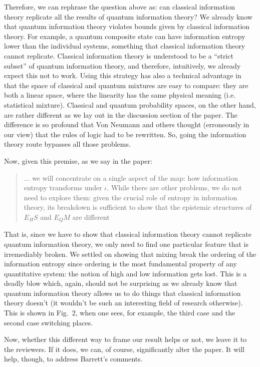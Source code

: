 \documentclass[11pt]{article}
\begin{document}
	Therefore, we can rephrase the question above as: can classical information theory replicate all the results of quantum information theory? We already know that quantum information theory violates bounds given by classical information theory. For example, a quantum composite state can have information entropy lower than the individual systems, something that classical information theory cannot replicate. Classical information theory is understood to be a ``strict subset'' of quantum information theory, and therefore, intuitively, we already expect this not to work. Using this strategy has also a technical advantage in that the space of classical and quantum mixtures are easy to compare: they are both a linear space, where the linearity has the same physical meaning (i.e. statistical mixture). Classical and quantum probability spaces, on the other hand, are rather different as we lay out in the discussion section of the paper. The difference is so profound that Von Neumann and others thought (erroneously in our view) that the rules of logic had to be rewritten. So, going the information theory route bypasses all those problems.
	
	Now, given this premise, as we say in the paper:
	\begin{quote}
		... we will concentrate on a single aspect of the map: how information entropy transforms under $\iota$. While there are other problems, we do not need to explore them: given the crucial role of entropy in information theory, its breakdown is
		sufficient to show that the epistemic structures of $E_HS$
		and $E_QM$ are different
	\end{quote}
	That is, since we have to show that classical information theory cannot replicate quantum information theory, we only need to find one particular feature that is irremediably broken. We settled on showing that mixing break the ordering of the information entropy since ordering is the most fundamental property of any quantitative system: the notion of high and low information gets lost. This is a deadly blow which, again, should not be surprising as we already know that quantum information theory allows us to do things that classical information theory doesn't (it wouldn't be such an interesting field of research otherwise). This is shown in Fig.~2, when one sees, for example, the third case and the second case switching places.
	
	Now, whether this different way to frame our result helps or not, we leave it to the reviewers. If it does, we can, of course, significantly alter the paper. It will help, though, to address Barrett's comments.
\end{document}
